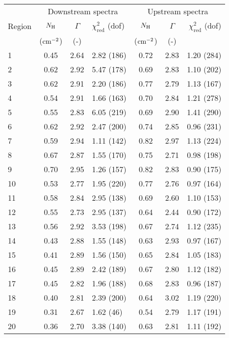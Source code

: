 \begin{tabular}{@{}lcclccr@{}}
\toprule
{} & \multicolumn{3}{c}{Downstream spectra}
   & \multicolumn{3}{c}{Upstream spectra} \\
\cmidrule(lr){2-4} \cmidrule(l){5-7}
Region & $N_{\mathrm{H}}$ & $\Gamma$ & $\chi^2_{\mathrm{red}}$ (dof)
       & $N_{\mathrm{H}}$ & $\Gamma$ & $\chi^2_{\mathrm{red}}$ (dof) \\
{} & ($\mathrm{cm}^{-2}$) & (-) & {}
   & ($\mathrm{cm}^{-2}$) & (-) & {} \\
\midrule
1  & 0.45 & 2.64 & 2.82 (186) & 0.72 & 2.83 & 1.20 (284) \\
2  & 0.62 & 2.92 & 5.47 (178) & 0.69 & 2.83 & 1.10 (202) \\
3  & 0.62 & 2.91 & 2.20 (186) & 0.77 & 2.79 & 1.13 (167) \\
\cmidrule{1-7}
4  & 0.54 & 2.91 & 1.66 (163) & 0.70 & 2.84 & 1.21 (278) \\
5  & 0.55 & 2.83 & 6.05 (219) & 0.69 & 2.90 & 1.41 (290) \\
6  & 0.62 & 2.92 & 2.47 (200) & 0.74 & 2.85 & 0.96 (231) \\
7  & 0.59 & 2.94 & 1.11 (142) & 0.82 & 2.97 & 1.13 (224) \\
8  & 0.67 & 2.87 & 1.55 (170) & 0.75 & 2.71 & 0.98 (198) \\
9  & 0.70 & 2.95 & 1.26 (157) & 0.82 & 2.83 & 0.90 (175) \\
10 & 0.53 & 2.77 & 1.95 (220) & 0.77 & 2.76 & 0.97 (164) \\
\cmidrule{1-7}
11 & 0.58 & 2.84 & 2.95 (138) & 0.69 & 2.60 & 1.10 (153) \\
12 & 0.55 & 2.73 & 2.95 (137) & 0.64 & 2.44 & 0.90 (172) \\
13 & 0.56 & 2.92 & 3.53 (198) & 0.67 & 2.74 & 1.12 (235) \\
\cmidrule{1-7}
14 & 0.43 & 2.88 & 1.55 (148) & 0.63 & 2.93 & 0.97 (167) \\
15 & 0.41 & 2.89 & 1.56 (150) & 0.65 & 2.84 & 1.05 (183) \\
16 & 0.45 & 2.89 & 2.42 (189) & 0.67 & 2.80 & 1.12 (182) \\
17 & 0.45 & 2.82 & 1.96 (188) & 0.68 & 2.83 & 0.96 (187) \\
\cmidrule{1-7}
18 & 0.40 & 2.81 & 2.39 (200) & 0.64 & 3.02 & 1.19 (220) \\
19 & 0.31 & 2.67 & 1.62 (46)  & 0.54 & 2.79 & 1.17 (191) \\
20 & 0.36 & 2.70 & 3.38 (140) & 0.63 & 2.81 & 1.11 (192) \\
\bottomrule
\end{tabular}
